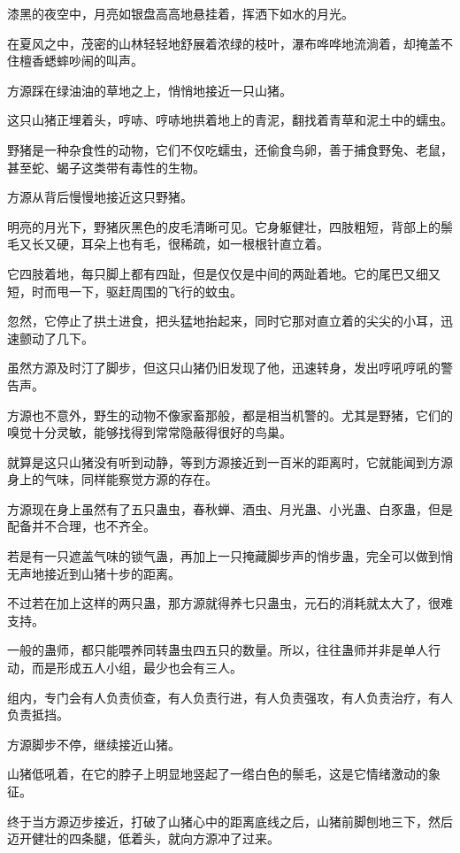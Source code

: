
\begin{this_body}

漆黑的夜空中，月亮如银盘高高地悬挂着，挥洒下如水的月光。

在夏风之中，茂密的山林轻轻地舒展着浓绿的枝叶，瀑布哗哗地流淌着，却掩盖不住檀香蟋蟀吵闹的叫声。

方源踩在绿油油的草地之上，悄悄地接近一只山猪。

这只山猪正埋着头，哼哧、哼哧地拱着地上的青泥，翻找着青草和泥土中的蠕虫。

野猪是一种杂食性的动物，它们不仅吃蠕虫，还偷食鸟卵，善于捕食野兔、老鼠，甚至蛇、蝎子这类带有毒性的生物。

方源从背后慢慢地接近这只野猪。

明亮的月光下，野猪灰黑色的皮毛清晰可见。它身躯健壮，四肢粗短，背部上的鬃毛又长又硬，耳朵上也有毛，很稀疏，如一根根针直立着。

它四肢着地，每只脚上都有四趾，但是仅仅是中间的两趾着地。它的尾巴又细又短，时而甩一下，驱赶周围的飞行的蚊虫。

忽然，它停止了拱土进食，把头猛地抬起来，同时它那对直立着的尖尖的小耳，迅速颤动了几下。

虽然方源及时汀了脚步，但这只山猪仍旧发现了他，迅速转身，发出哼吼哼吼的警告声。

方源也不意外，野生的动物不像家畜那般，都是相当机警的。尤其是野猪，它们的嗅觉十分灵敏，能够找得到常常隐蔽得很好的鸟巢。

就算是这只山猪没有听到动静，等到方源接近到一百米的距离时，它就能闻到方源身上的气味，同样能察觉方源的存在。

方源现在身上虽然有了五只蛊虫，春秋蝉、酒虫、月光蛊、小光蛊、白豕蛊，但是配备并不合理，也不齐全。

若是有一只遮盖气味的锁气蛊，再加上一只掩藏脚步声的悄步蛊，完全可以做到悄无声地接近到山猪十步的距离。

不过若在加上这样的两只蛊，那方源就得养七只蛊虫，元石的消耗就太大了，很难支持。

一般的蛊师，都只能喂养同转蛊虫四五只的数量。所以，往往蛊师并非是单人行动，而是形成五人小组，最少也会有三人。

组内，专门会有人负责侦查，有人负责行进，有人负责强攻，有人负责治疗，有人负责抵挡。

方源脚步不停，继续接近山猪。

山猪低吼着，在它的脖子上明显地竖起了一绺白色的鬃毛，这是它情绪激动的象征。

终于当方源迈步接近，打破了山猪心中的距离底线之后，山猪前脚刨地三下，然后迈开健壮的四条腿，低着头，就向方源冲了过来。


\end{this_body}
